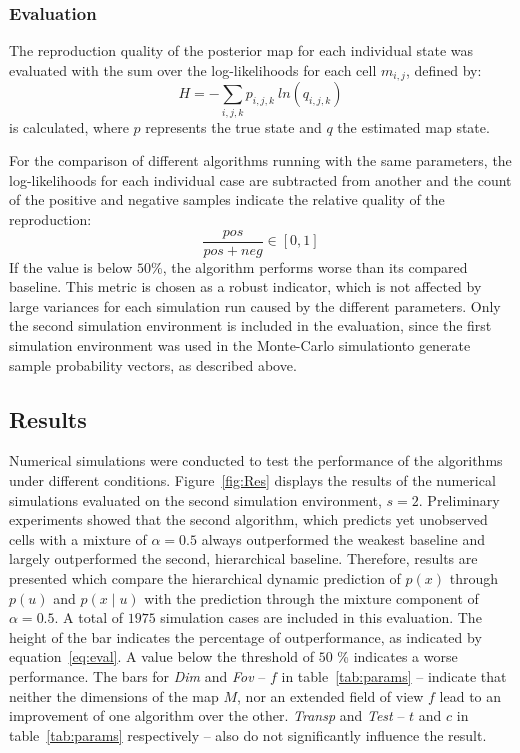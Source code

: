 \documentclass[twocolumn,letterpaper]{IEEEAerospaceCLS}  %
\begin{document}
\subsubsection{Evaluation}\label{ssec:SimMetEval}
The reproduction quality of the posterior map for each individual state was evaluated with the sum over the log-likelihoods for each cell $m_{i,j}$, defined by:
\begin{equation} \label{eq:Entropy}
    H = - \sum_{i,j,k} p_{i,j,k}~ln(q_{i,j,k})
\end{equation}
is calculated, where $p$ represents the true state and $q$ the estimated map state.

For the comparison of different algorithms running with the same parameters, the log-likelihoods for each individual case are subtracted from another and the count of the positive and negative samples indicate the relative quality of the reproduction:
\begin{equation} \label{eq:eval}
    \frac{pos}{pos+neg} \in [0, 1]
\end{equation} If the value is below $50$\%, the algorithm performs worse than its compared baseline. This metric is chosen as a robust indicator, which is not affected by large variances for each simulation run caused by the different parameters. 
Only the second simulation environment is included in the evaluation, since the first simulation environment was used in the Monte-Carlo simulationto generate sample probability vectors, as described above.

\subsection{Results} \label{ssec:SimRes}
Numerical simulations were conducted to test the performance of the algorithms under different conditions. Figure~\ref{fig:Res} displays the results of the numerical simulations evaluated on the second simulation environment, $s=2$. Preliminary experiments showed that the second algorithm, which predicts yet unobserved cells with a mixture of $\alpha = 0.5$ always outperformed the weakest baseline and largely outperformed the second, hierarchical baseline. Therefore, results are presented which compare the hierarchical dynamic prediction of $p(x)$ through $p(u)$ and $p(x\mid u)$ with the prediction through the mixture component of $\alpha = 0.5$. A total of $1975$ simulation cases are included in this evaluation. The height of the bar indicates the percentage of outperformance, as indicated by equation~\ref{eq:eval}. A value below the threshold of $50$ \% indicates a worse performance.
The bars for \emph{Dim} and \emph{Fov} -- $f$ in table~\ref{tab:params} -- indicate that neither the dimensions of the map $M$, nor an extended field of view $f$ lead to an improvement of one algorithm over the other. \emph{Transp} and \emph{Test} -- $t$ and $c$ in table~\ref{tab:params} respectively -- also do not significantly influence the result.
\end{document}
